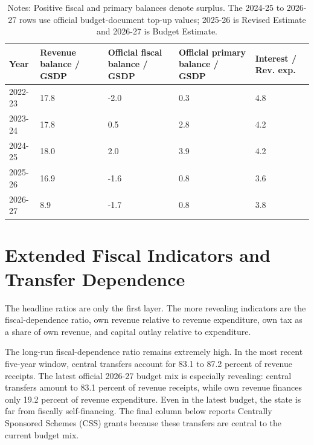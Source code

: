 \documentclass[11pt,a4paper]{article}
\begin{document}
\begin{table}[H]
\centering
\caption{Core fiscal indicators, Arunachal Pradesh, 2022-23 to 2026-27}
\small
\begin{tabular}{L{1.7cm}C{1.8cm}C{2.0cm}C{2.1cm}C{1.8cm}}
\toprule
Year & Revenue balance / GSDP & Official fiscal balance / GSDP & Official primary balance / GSDP & Interest / Rev. exp. \\
-23 & 17.8 & -2.0 & 0.3 & 4.8 \\
2023-24 & 17.8 & 0.5 & 2.8 & 4.2 \\
2024-25 & 18.0 & 2.0 & 3.9 & 4.2 \\
2025-26 & 16.9 & -1.6 & 0.8 & 3.6 \\
2026-27 & 8.9 & -1.7 & 0.8 & 3.8 \\
\bottomrule
\end{tabular}
\caption*{\footnotesize Notes: Positive fiscal and primary balances denote surplus. The 2024-25 to 2026-27 rows use official budget-document top-up values; 2025-26 is Revised Estimate and 2026-27 is Budget Estimate.}
\end{table}

\section{Extended Fiscal Indicators and Transfer Dependence}

The headline ratios are only the first layer. The more revealing indicators are the fiscal-dependence ratio, own revenue relative to revenue expenditure, own tax as a share of own revenue, and capital outlay relative to expenditure.

The long-run fiscal-dependence ratio remains extremely high. In the most recent five-year window, central transfers account for 83.1 to 87.2 percent of revenue receipts. The latest official 2026-27 budget mix is especially revealing: central transfers amount to 83.1 percent of revenue receipts, while own revenue finances only 19.2 percent of revenue expenditure. Even in the latest budget, the state is far from fiscally self-financing. The final column below reports Centrally Sponsored Schemes (CSS) grants because these transfers are central to the current budget mix.
\end{document}
